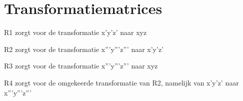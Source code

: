 \documentclass{article}
\begin{document}
\section{\textbf{Transformatiematrices}}
\begin{maplelatex}\begin{Maple Normal}{
R1 zorgt voor de transformatie x'y'z' naar xyz}\end{Maple Normal}
\end{maplelatex}
\begin{maplelatex}\begin{Maple Normal}{
R2 zorgt voor de transformatie x'''y'''z''' naar x'y'z'}\end{Maple Normal}
\end{maplelatex}
\begin{maplelatex}\begin{Maple Normal}{
R3 zorgt voor de transformatie x'''y'''z''' naar xyz}\end{Maple Normal}
\end{maplelatex}
\begin{maplelatex}\begin{Maple Normal}{
R4 zorgt voor de omgekeerde transformatie van R2, namelijk van x'y'z' naar x'''y'''z'''}\end{Maple Normal}
\end{maplelatex}
\end{document}
